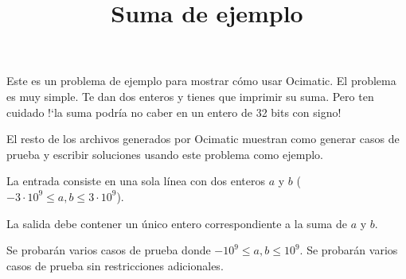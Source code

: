 \documentclass{oci}
\title{Suma de ejemplo}
\begin{document}
\begin{problemDescription}
  Este es un problema de ejemplo para mostrar cómo usar Ocimatic.
  El problema es muy simple.
  Te dan dos enteros y tienes que imprimir su suma.
  Pero ten cuidado !`la suma podría no caber en un entero de 32 bits con signo!

  El resto de los archivos generados por Ocimatic muestran como generar
  casos de prueba y escribir soluciones usando este problema como ejemplo.
\end{problemDescription}

\begin{inputDescription}
  La entrada consiste en una sola línea con dos enteros $a$ y $b$ ($-3\cdot10^9 \leq a, b \leq 3\cdot10^9$).
\end{inputDescription}

\begin{outputDescription}
  La salida debe contener un único entero correspondiente a la suma de $a$ y $b$.
\end{outputDescription}

\begin{scoreDescription}
   Se probarán varios casos de prueba donde $-10^9\leq a, b \leq 10^9$.
   Se probarán varios casos de prueba sin restricciones adicionales.
\end{scoreDescription}

\begin{sampleDescription}
\end{sampleDescription}
\end{document}
